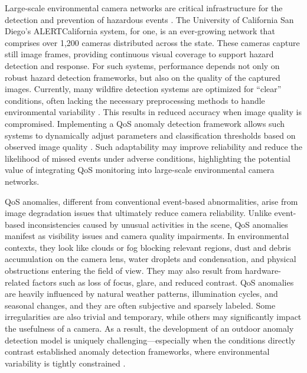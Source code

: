 \documentclass{article}
\begin{document}
Large-scale environmental camera networks are critical infrastructure for the detection and prevention of hazardous events \cite{costa2020use, govil2020preliminary, mohapatra2022early}. The University of California San Diego's ALERTCalifornia system, for one, is an ever-growing network that comprises over 1,200 cameras distributed across the state. These cameras capture still image frames, providing continuous visual coverage to support hazard detection and response. For such systems, performance depends not only on robust hazard detection frameworks, but also on the quality of the captured images\cite{mahadev2026intelligent, wang2022semi}. Currently, many wildfire detection systems are optimized for ``clear'' conditions, often lacking the necessary preprocessing methods to handle environmental variability \cite{mahadev2026intelligent, wang2022semi}. This results in reduced accuracy when image quality is compromised. Implementing a \ac{QoS} anomaly detection framework allows such systems to dynamically adjust parameters and classification thresholds based on observed image quality \cite{govil2020preliminary}. Such adaptability may improve reliability and reduce the likelihood of missed events under adverse conditions, highlighting the potential value of integrating \ac{QoS} monitoring into large-scale environmental camera networks.

\Ac{QoS} anomalies, different from conventional event-based abnormalities, arise from image degradation issues that ultimately reduce camera reliability. Unlike event-based inconsistencies caused by unusual activities in the scene, \ac{QoS} anomalies manifest as visibility issues and camera quality impairments. In environmental contexts, they look like clouds or fog blocking relevant regions, dust and debris accumulation on the camera lens, water droplets and condensation, and physical obstructions entering the field of view. They may also result from hardware-related factors such as loss of focus, glare, and reduced contrast. \Ac{QoS} anomalies are heavily influenced by natural weather patterns, illumination cycles, and seasonal changes, and they are often subjective and sparsely labeled. Some irregularities are also trivial and temporary, while others may significantly impact the usefulness of a camera. As a result, the development of an outdoor anomaly detection model is uniquely challenging—especially when the conditions directly contrast established anomaly detection frameworks, where environmental variability is tightly constrained \cite{bergmann2019mvtec, lin2025visual}.
\end{document}
